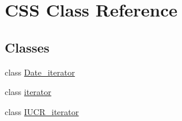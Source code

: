 \hypertarget{classCSS}{}\section{C\+S\+S Class Reference}
\label{classCSS}
\subsection*{Classes}
\begin{DoxyCompactItemize}
\item 
class \hyperlink{classCSS_1_1Date__iterator}{Date\+\_\+iterator}
\item 
class \hyperlink{classCSS_1_1iterator}{iterator}
\item 
class \hyperlink{classCSS_1_1IUCR__iterator}{I\+U\+C\+R\+\_\+iterator}
\end{DoxyCompactItemize}
